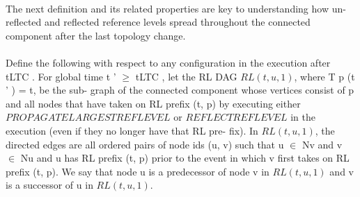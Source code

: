 \paragraph{}The next definition and its related properties are key to understanding how un- reflected and reflected reference levels spread throughout the connected component after the last topology change.
\paragraph{}Define the following with respect to any configuration in the execution after tLTC . For global time t ' $\geq$ tLTC , let the RL DAG $RL (t, u, 1)$, where T p (t ' ) = t, be the sub- graph of the connected component whose vertices consist of p and all nodes that have taken on RL prefix (t, p) by executing either $PROPAGATELARGESTREFLEVEL$ or $REFLECTREFLEVEL$ in the execution (even if they no longer have that RL pre- fix). In $RL (t, u, 1)$, the directed edges are all ordered pairs of node ids (u, v) such that u $\in$ Nv and v $\in$ Nu and u has RL prefix (t, p) prior to the event in which v first takes on RL prefix (t, p). We say that node u is a predecessor of node v in $RL (t, u, 1)$ and v is a successor of u in $RL (t, u, 1)$.

